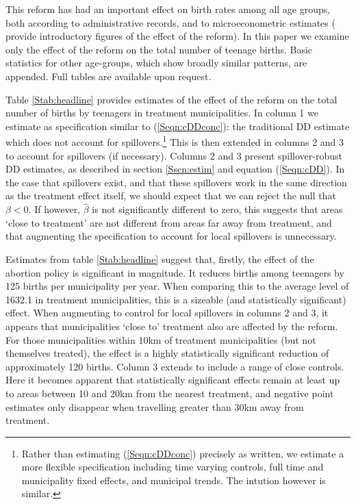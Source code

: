 \documentclass{article}
\begin{document}
\begin{spacing}{1.1}
This reform has had an important effect on birth rates among all age groups,
both according to administrative records, and to microeconometric estimates
(\citet{ClarkeMuhlrad2014} provide introductory figures of the effect of the
reform).  In this paper we examine only the effect of the reform on the total
number of teenage births.  Basic statistics for other age-groups, which show 
broadly similar patterns, are appended.  Full tables are available upon 
request.

Table \ref{Stab:headline} provides estimates of the effect of the reform on
the total number of births by teenagers in treatment municipalities.  In 
column 1 we estimate as specification similar to (\ref{Seqn:cDDconc}): the 
traditional DD estimate which does not account for spillovers.\footnote{Rather 
than estimating (\ref{Seqn:cDDconc}) precisely as written, we estimate a more 
flexible specification including time varying controls, full time and
municipality fixed effects, and municipal trends.  The intution however is
similar.}  This is then extended in columns 2 and 3 to account for spillovers
(if necessary).  Columns 2 and 3 present spillover-robust DD estimates, as 
described in section \ref{Sscn:estim} and equation (\ref{Seqn:cDD}).  In the
case that spillovers exist, and that these spillovers work in the same 
direction as the treatment effect itself, we should expect that we can reject
the null that $\beta<0$.  If however, $\hat\beta$ is not significantly 
different to zero, this suggests that areas `close to treatment' are not
different from areas far away from treatment, and that augmenting the 
specification to account for local spillovers is unnecessary.



Estimates from table \ref{Stab:headline} suggest that, firstly, the effect of
the abortion policy is significant in magnitude.  It reduces births among 
teenagers by 125 births per municipality per year. When comparing this to the
average level of 1632.1 in treatment municipalities, this is a sizeable (and
statistically significant) effect.  When augmenting to control for local
spillovers in columns 2 and 3, it appears that municipalities `close to' 
treatment also are affected by the reform.  For those municipalities within
10km of treatment municipalities (but not themselves treated), the effect is 
a highly statistically significant reduction of approximately 120 births.
Column 3 extends to include a range of close controls.  Here it becomes
apparent that statistically significant effects remain at least up to areas
between 10 and 20km from the nearest treatment, and negative point estimates
only disappear when travelling greater than 30km away from treatment.


\end{spacing}
\end{document}
